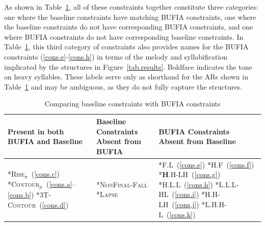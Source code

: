 \documentclass{CUP-JNL-PHO}%
\theoremstyle{definition}
\numberwithin{equation}{section}
\theoremstyle{definition}
\begin{document}
As shown in Table~\ref{sec5.tab.compare}, all of these
constraints together constitute three categories: one where the
baseline constraints have matching BUFIA constraints, one where the
baseline constraints do not have corresponding BUFIA constraints, and
one where BUFIA constraints do not have corresponding baseline
constraints. In Table~\ref{sec5.tab.compare}, this third category of
constraints also provides names for the BUFIA constraints
(\ref{cons.e}-\ref{cons.h}) in terms of the melody and syllabification
implicated by the structures in Figure~\ref{tab.results}. Boldface 
indicates the tone on heavy syllables. These labels serve only 
as shorthand for the ARs shown in Table~\ref{sec5.tab.compare} and 
may be ambiguous, as they do not fully capture the structures. 

\begin{table}[h!]
	\centering
	\begin{tabular}{p{4cm}p{3.5cm}p{3.5cm}}
		\toprule
		\textbf{Present in both \newline BUFIA and Baseline} 
		& \textbf{Baseline Constraints \newline Absent from BUFIA} 
		& \textbf{BUFIA Constraints \newline Absent from Baseline} \\
		\midrule
		\textsc{*Rise}$_\sigma$~(\ref{cons.c})\newline
		\textsc{*Contour}$_\mu$~(\ref{cons.a}--\ref{cons.b})\newline
		\textsc{*3T-Contour}~(\ref{cons.d})\newline
		& \textsc{*NonFinal-Fall}\newline
		\textsc{*Lapse}
		& \textsc{*F.L}~(\ref{cons.e})\newline
		\textsc{*H.F}~(\ref{cons.f})\newline
		\textsc{*\textbf{H}.H-LH}~(\ref{cons.g})\newline
		\textsc{*H.L.L}~(\ref{cons.h})\newline
		\textsc{*L.L.L-HL}~(\ref{cons.i})\newline
		\textsc{*H.H-LH}~(\ref{cons.j})\newline
		\textsc{*L.H.H-L}~(\ref{cons.k})\\
		\bottomrule
	\end{tabular}
	\caption{Comparing baseline constraints with BUFIA constraints}
	\label{sec5.tab.compare}
\end{table}
\end{document}
